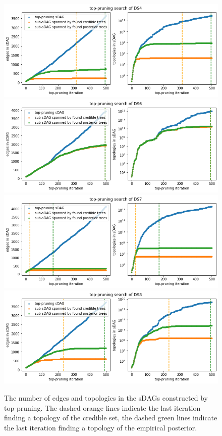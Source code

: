 \documentclass{article}
\begin{document}
\begin{figure}[!t]\centering
\includegraphics[scale=0.4]{figures/tp_ds4_counts.png}
\includegraphics[scale=0.4]{figures/tp_ds6_counts.png}
\includegraphics[scale=0.4]{figures/tp_ds7_counts.png}
\includegraphics[scale=0.4]{figures/tp_ds8_counts.png}
\caption{The number of edges and topologies in the sDAGs constructed by top-pruning.
The dashed orange lines indicate the last iteration finding a topology of the credible set, the dashed green lines indicate the last iteration finding a topology of the empirical posterior. }
\label{fig:topPruningCounts}
\end{figure}
\clearpage
\end{document}
